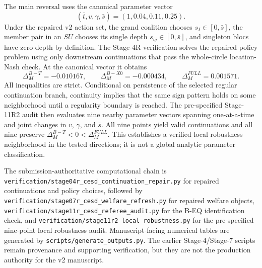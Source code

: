 The main reversal uses the canonical parameter vector
\[
(\bar t,v,\gamma,\bar s)=(1,0.04,0.11,0.25).
\]
Under the repaired v2 action set, the grand coalition chooses $s_I\in[0,\bar s]$, the member pair in an $SU$ chooses its single depth $s_{ij}\in[0,\bar s]$, and singleton blocs have zero depth by definition. The Stage-4R verification solves the repaired policy problem using only downstream continuations that pass the whole-circle location-Nash check. At the canonical vector it obtains
\[
\Delta_M^{B-T}=-0.010167,
\qquad
\Delta_M^{B-X0}=-0.000434,
\qquad
\Delta_M^{FULL}=0.001571.
\]
All inequalities are strict. Conditional on persistence of the selected regular continuation branch, continuity implies that the same sign pattern holds on some neighborhood until a regularity boundary is reached. The pre-specified Stage-11R2 audit then evaluates nine nearby parameter vectors spanning one-at-a-time and joint changes in $v$, $\gamma$, and $\bar s$. All nine points yield valid continuations and all nine preserve $\Delta_M^{B-T}<0<\Delta_M^{FULL}$. This establishes a verified local robustness neighborhood in the tested directions; it is not a global analytic parameter classification.

The submission-authoritative computational chain is \texttt{verification/stage04r\_cesd\_continuation\_repair.py} for repaired continuations and policy choices, followed by \texttt{verification/stage07r\_cesd\_welfare\_refresh.py} for repaired welfare objects, \texttt{verification/stage11r\_cesd\_referee\_audit.py} for the B-EQ identification check, and \texttt{verification/stage11r2\_local\_robustness.py} for the pre-specified nine-point local robustness audit. Manuscript-facing numerical tables are generated by \texttt{scripts/generate\_outputs.py}. The earlier Stage-4/Stage-7 scripts remain provenance and supporting verification, but they are not the production authority for the v2 manuscript.